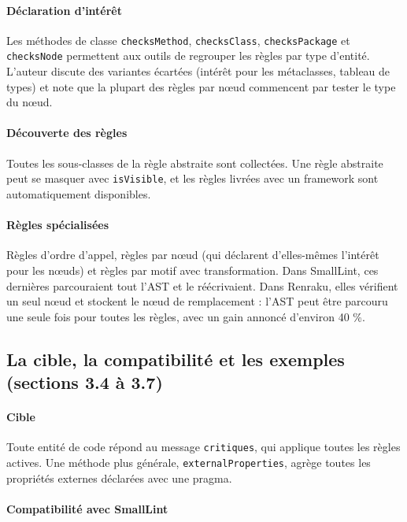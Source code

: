 \documentclass[11pt,a4paper]{article}
\begin{document}
\paragraph{Déclaration d’intérêt}

Les méthodes de classe \texttt{checksMethod}, \texttt{checksClass}, \texttt{checksPackage} et \texttt{checksNode} permettent aux outils de regrouper les règles par type d’entité. L’auteur discute des variantes écartées (intérêt pour les métaclasses, tableau de types) et note que la plupart des règles par nœud commencent par tester le type du nœud.

\paragraph{Découverte des règles}

Toutes les sous-classes de la règle abstraite sont collectées. Une règle abstraite peut se masquer avec \texttt{isVisible}, et les règles livrées avec un framework sont automatiquement disponibles.

\paragraph{Règles spécialisées}

Règles d’ordre d’appel, règles par nœud (qui déclarent d’elles-mêmes l’intérêt pour les nœuds) et règles par motif avec transformation. Dans SmallLint, ces dernières parcouraient tout l’AST et le réécrivaient. Dans Renraku, elles vérifient un seul nœud et stockent le nœud de remplacement : l’AST peut être parcouru une seule fois pour toutes les règles, avec un gain annoncé d’environ 40 \%.

\subsection{La cible, la compatibilité et les exemples (sections 3.4 à 3.7)}

\paragraph{Cible}

Toute entité de code répond au message \texttt{critiques}, qui applique toutes les règles actives. Une méthode plus générale, \texttt{externalProperties}, agrège toutes les propriétés externes déclarées avec une pragma.

\paragraph{Compatibilité avec SmallLint}
\end{document}
